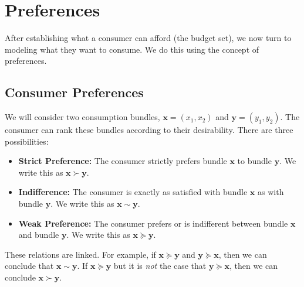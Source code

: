 \chapter{Preferences}\label{chap:preferences}

After establishing what a consumer can afford (the budget set), we now turn to modeling what they want to consume. We do this using the concept of preferences.

\section{Consumer Preferences}
We will consider two consumption bundles, $\mathbf{x}=(x_1, x_2)$ and $\mathbf{y}=(y_1, y_2)$. The consumer can rank these bundles according to their desirability. There are three possibilities:
\begin{itemize}
    \item \textbf{Strict Preference:} The consumer strictly prefers bundle $\mathbf{x}$ to bundle $\mathbf{y}$. We write this as $\mathbf{x} \succ \mathbf{y}$.
    \item \textbf{Indifference:} The consumer is exactly as satisfied with bundle $\mathbf{x}$ as with bundle $\mathbf{y}$. We write this as $\mathbf{x} \sim \mathbf{y}$.
    \item \textbf{Weak Preference:} The consumer prefers or is indifferent between bundle $\mathbf{x}$ and bundle $\mathbf{y}$. We write this as $\mathbf{x} \succeq \mathbf{y}$.
\end{itemize}
These relations are linked. For example, if $\mathbf{x} \succeq \mathbf{y}$ and $\mathbf{y} \succeq \mathbf{x}$, then we can conclude that $\mathbf{x} \sim \mathbf{y}$. If $\mathbf{x} \succeq \mathbf{y}$ but it is \textit{not} the case that $\mathbf{y} \succeq \mathbf{x}$, then we can conclude $\mathbf{x} \succ \mathbf{y}$.

